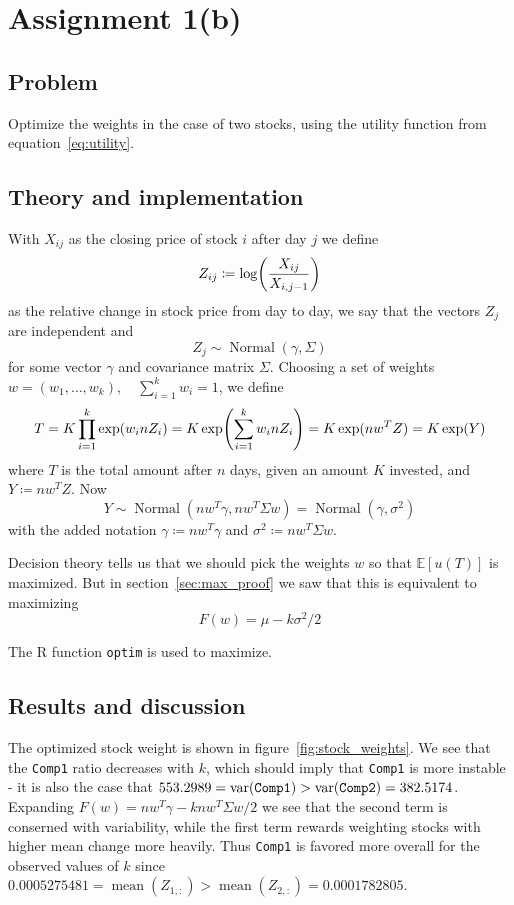 \documentclass[11pt, a4paper]{article}
\let\originalleft\left
\let\originalright\right
\renewcommand{\left}{\mathopen{}\mathclose\bgroup\originalleft}
\renewcommand{\right}{\aftergroup\egroup\originalright}
\DeclareMathOperator{\Normal}{Normal}
\DeclareMathOperator{\mean}{mean}
\DeclareMathOperator{\var}{var}
\begin{document}
\section{Assignment 1(b)}
\subsection{Problem}
Optimize the weights in the case of two stocks,
using the utility function from equation~\ref{eq:utility}.
\subsection{Theory and implementation}
With $X_{ij}$ as the closing price of stock $i$ after day $j$ we define
$$ Z_{ij} \coloneqq \log\left(\frac{X_{ij}}{X_{i,j-1}}\right) $$
as the relative change in stock price from day to day,
we say that the vectors $Z_j$ are independent and
$$ Z_j \sim \Normal(\gamma, \Sigma) $$
for some vector $\gamma$ and covariance matrix $\Sigma$.
Choosing a set of weights $w = (w_1, \ldots, w_k), \quad \sum_{i=1}^k w_i = 1$,
we define
$$ T = K \prod_{i=1}^k \exp(w_i n Z_i) = K \exp\left(\sum_{i=1}^k w_i n Z_i\right)
	= K \exp(n w^T Z) = K \exp(Y) $$
where $T$ is the total amount after $n$ days, given an amount $K$ invested,
and $Y \coloneqq n w^T Z$.
Now
$$ Y \sim \Normal(n w^T \gamma, n w^T \Sigma w) = \Normal(\gamma, \sigma^2) $$
with the added notation
$\gamma \coloneqq n w^T \gamma$ and $\sigma^2 \coloneqq n w^T \Sigma w$.

Decision theory tells us that we should pick the weights $w$ so that
$\mathbb E[u(T)]$ is maximized.
But in section~\ref{sec:max_proof} we saw that this is equivalent to maximizing
$$ F(w) = \mu - k \sigma^2 / 2 $$

The R function \texttt{optim} is used to maximize.
\subsection{Results and discussion}
The optimized stock weight is shown in figure~\ref{fig:stock_weights}.
We see that the \texttt{Comp1} ratio decreases with $k$,
which should imply that \texttt{Comp1} is more instable
- it is also the case that
$\num{553.2989} = \var(\text{\texttt{Comp1}}) > \var(\text{\texttt{Comp2}}) = \num{382.5174}$.
Expanding $F(w) = n w^T \gamma - k n w^T \Sigma w / 2$
we see that the second term is conserned with variability,
while the first term rewards weighting stocks with higher mean change more heavily.
Thus \texttt{Comp1} is favored more overall for the observed values of $k$
since $\num{0.0005275481} = \mean(Z_{1,:}) > \mean(Z_{2,:}) = \num{0.0001782805}$.
\end{document}
